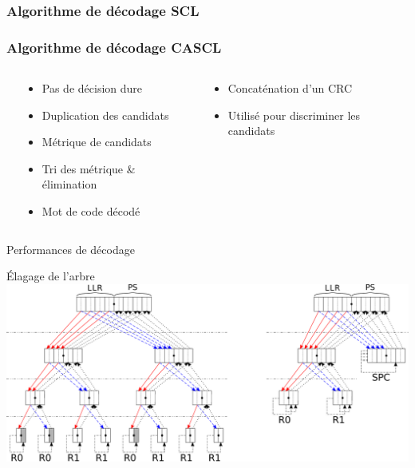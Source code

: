 \begin{frame}[c]{}
  	\frametitle<1-7>{Algorithme de décodage SCL}
  	\frametitle<8->{Algorithme de décodage CASCL}
	\begin{columns}[T] %

		\begin{column}{.7\textwidth}


		\end{column}
 {
		\begin{column}{.3\textwidth}
			\begin{itemize}
				\item<3-7> Pas de décision dure
				\item<4-7> Duplication des candidats
				\item<5-7> Métrique de candidats
				\item<6-7> Tri des métrique \& élimination
				\item<7-7> Mot de code décodé
			\end{itemize}
		\end{column}
}
 {
		\begin{column}{.3\textwidth}
			\begin{itemize}
				\item<8-> Concaténation d'un CRC
				\item<9-> Utilisé pour discriminer les candidats
			\end{itemize}
		\end{column}
}
	\end{columns}
\end{frame}


\begin{frame}[c]{Performances de décodage}
\end{frame}

\begin{frame}[c]{\'Elagage de l'arbre}
			\includegraphics[width=\textwidth]{./fig/pruning}
\end{frame}
	
